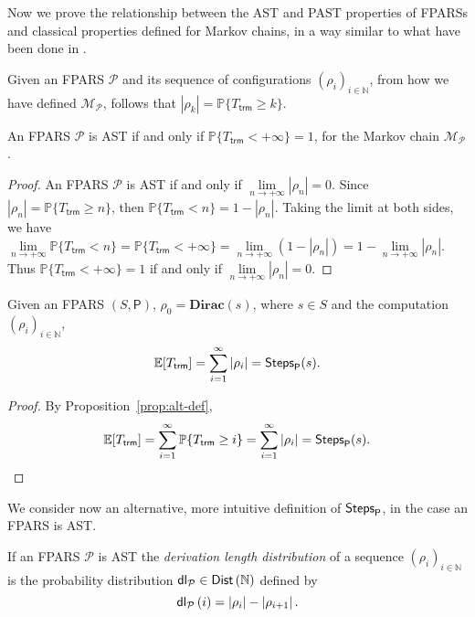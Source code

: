 \begin{LONG}
	Now we prove the relationship between the AST and PAST properties of FPARSs and classical properties defined for Markov chains, in a way similar to what have been done in \cite{bournez_proving_2005,ferrer_fioriti_probabilistic_2015}.
	\begin{remark}
		Given an FPARS $\mathcal{P}$ and its sequence of configurations $(\rho_i)_{i\in\mathbb{N}}$, from how we have defined $\mathcal{M_P}$, follows that $|\rho_k| = \mathbb{P}\{T_\mathsf{trm}\geq k\}$.
	\end{remark}
	\begin{proposition}
		An FPARS $\mathcal{P}$ is AST if and only if $\mathbb{P}\{T_{\mathsf{trm}}<+\infty\}=1$, for the Markov chain $\mathcal{M_P}$.
	\end{proposition}
	\begin{proof}
		An FPARS $\mathcal{P}$ is AST if and only if $\underset{n\rightarrow +\infty}{\lim}\left|\rho_{n}\right|=0$. Since $|\rho_n| = \mathbb{P}\{T_\mathsf{trm}\geq n\}$, then $\mathbb{P}\{T_\mathsf{trm}< n\}=1-|\rho_n|$. Taking the limit at both sides, we have $\underset{n\rightarrow +\infty}{\lim} \mathbb{P}\{T_\mathsf{trm}< n\} = \mathbb{P}\{T_\mathsf{trm}< +\infty\}= \underset{n\rightarrow +\infty}{\lim} (1-|\rho_n|)=1-\underset{n\rightarrow+\infty}{\lim} |\rho_n|$. Thus $\mathbb{P}\{T_\mathsf{trm}< +\infty\}=1$ if and only if $\underset{n\rightarrow+\infty}{\lim} |\rho_n|=0.$
	\end{proof}
	\begin{proposition}
		Given an FPARS $(S,\mathsf{P})$, $\rho_0=\mathbf{Dirac}(s)$,
		where $s\in S$ and the computation $(\rho_i)_{i\in\mathbb{N}}$,
		$$
		\mathbb{E} [ T_{\mathsf{trm}}]=\sum\limits_{i=1}^{\infty} \left|\rho_i\right|=\mathsf{Steps}_{\mathsf{P}}(s).
		$$
	\end{proposition}
	\begin{proof}
		By Proposition~\ref{prop:alt-def}, 
		$$
		\mathbb{E} [ T_{\mathsf{trm}}]=\sum\limits_{i=1}^{\infty} \mathbb{P}\{T_{\mathsf{trm}}\geq i\}=\sum\limits_{i=1}^{\infty} \left|\rho_i\right|=\mathsf{Steps}_{\mathsf{P}}(s).
		$$
	\end{proof}
	We consider now an alternative, more intuitive definition of $\mathsf{Steps}_{\mathsf{P}}$, in the case an FPARS is AST.
	\begin{definition}
		If an FPARS $\mathcal{P}$ is AST the \emph{derivation length distribution} of a sequence $(\rho_i)_{i\in\mathbb{N}}$ is the probability distribution $\mathsf{dl_\mathcal{P}}\in\mathsf{Dist}\left(\mathbb{N}\right)$ defined by
		$$
		\mathsf{dl_\mathcal{P}}\left( i\right) =\left|\rho_i\right| -\left|\rho_{i+1}\right|.
$$
\end{definition}
\end{LONG}
